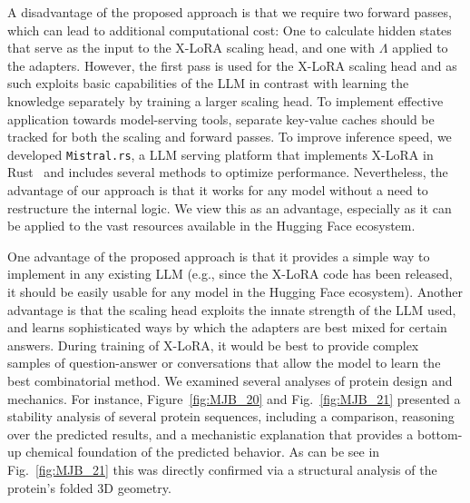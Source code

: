 A disadvantage of the proposed approach is that we require two forward passes, which can lead to additional computational cost: One to calculate hidden states that serve as the input to the X-LoRA scaling head, and one with $\Lambda$ applied to the adapters. However, the first pass is used for the X-LoRA scaling head and as such exploits basic capabilities of the LLM in contrast with learning the knowledge separately by training a larger scaling head. To implement effective application towards model-serving tools, separate key-value caches should be tracked for both the scaling and forward passes. To improve inference speed, we developed \texttt{Mistral.rs}, a LLM serving platform that implements X-LoRA in Rust~\cite{matsakis2014rust} and includes several methods to optimize performance. Nevertheless, the advantage of our approach is that it works for any model without a need to restructure the internal logic. We view this as an advantage, especially as it can be applied to the vast resources available in the Hugging Face ecosystem.

One advantage of the  proposed approach is that it provides a simple way to implement in any existing LLM (e.g., since the X-LoRA code has been released, it should be easily usable for any model in the Hugging Face ecosystem). Another advantage is that the scaling head exploits the innate strength of the LLM used, and learns sophisticated ways by which the adapters are best mixed for certain answers. During training of X-LoRA, it would be best to provide complex samples of question-answer or conversations that allow the model to learn the best combinatorial method. We examined several analyses of protein design and mechanics. For instance, Figure~\ref{fig:MJB_20} and Fig.~\ref{fig:MJB_21} presented a stability analysis of several protein sequences, including a comparison, reasoning over the predicted results, and a mechanistic explanation that provides a bottom-up chemical foundation of the predicted behavior. As can be see in Fig.~\ref{fig:MJB_21} this was directly confirmed via a structural analysis of the protein's folded 3D geometry. 


